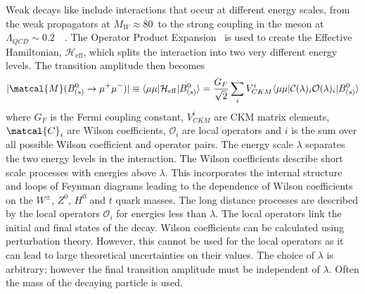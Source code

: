 {{Weak decays like \bmumu include interactions that occur at different energy scales, from the weak propagators at $M_W \approx 80$~\gevcc to the strong coupling in the \bsd meson at $\Lambda_{QCD} \sim 0.2$~\gev~\cite{Olive:2016xmw}. %
The Operator Product Expansion~\cite{PhysRev.179.1499,Wilson1972} is used to create the Effective Hamiltonian, $\mathcal{H}_{\mathrm{eff}}$, which splits the interaction into two very different energy levels. The transition amplitude then becomes 
\begin{equation}
|\matcal{M}(B^0_{(s)} \to \mu^+ \mu^-)| \equiv \langle \mu \mu | \mathcal{H}_{\mathrm{eff}} | B^0_{(s)} \rangle  = \frac{G_F}{\sqrt{2}} \displaystyle\sum_{i} V^i_{CKM} \langle \mu \mu | \mathcal{C}(\lambda)_i \mathcal{O}(\lambda)_i | B^0_{(s)} \rangle
\label{sec:eff_hamil_def}
\end{equation}
where $G_F$ is the Fermi coupling constant, $V_{CKM}^i$ are CKM matrix elements, $\matcal{C}_i$ are Wilson coefficients, $\mathcal{O}_i$ are local operators and $i$ is the sum over all possible Wilson coefficient and operator pairs. The energy scale $\lambda$ separates the two energy levels in the interaction. The Wilson coefficients describe short scale processes with energies above $\lambda$. This incorporates the internal structure and loops of Feynman diagrams leading to the dependence of Wilson coefficients on the $W^{\pm}$, $Z^0$, $H^0$ and $t$ quark masses. The long distance processes are described by the local operators $\mathcal{O}_i$ for energies less than $\lambda$. The local operators link the initial and final states of the decay. %
Wilson coefficients can be calculated using perturbation theory. However, this cannot be used for the local operators as it can lead to large theoretical uncertainties on their values. The choice of $\lambda$ is arbitrary; however the final transition amplitude must be independent of $\lambda$. Often the mass of the decaying particle is used. 

}}
